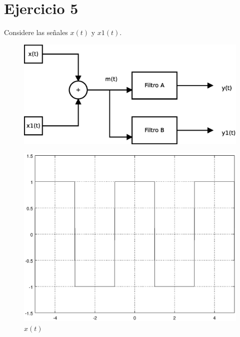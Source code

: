 \documentclass[a4paper,12pt]{article}
\begin{document}
\section{Ejercicio 5}
Considere las señales $x(t)$ y $x1(t)$.
\begin{multicols}{2}
    \begin{figure}[H]
        \begin{center}
            \includegraphics[width=\linewidth]{Diagrama3}
            \label{fig:Dia3}
        \end{center}
    \end{figure}
    \columnbreak
    \begin{figure}[H]
        \begin{center}
            \includegraphics[width=\linewidth]{ej5}
            \caption{$x(t)$}
            \label{fig:Ej5}
        \end{center}
    \end{figure}
\end{multicols}
\end{document}
